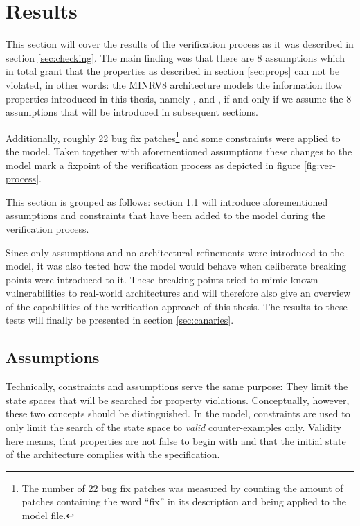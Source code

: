 
\section{Results}
\label{sec:results}

This section will cover the results of the verification process as it was described in section \ref{sec:checking}.
The main finding was that there are 8 assumptions which in total grant that the properties as described in section \ref{sec:props} can not be violated, in other words: the MINRV8 architecture models the information flow properties introduced in this thesis, namely ,  and , if and only if we assume the 8 assumptions that will be introduced in subsequent sections.

Additionally, roughly 22 bug fix patches\footnote{%
    The number of 22 bug fix patches was measured by counting the amount of patches containing the word \enquote{fix} in its description and being applied to the model file.
} and some  constraints were applied to the model.
Taken together with aforementioned assumptions these changes to the model mark a fixpoint of the verification process as depicted in figure \ref{fig:ver-process}.

This section is grouped as follows: section \ref{sec:assumptions} will introduce aforementioned assumptions and  constraints that have been added to the model during the verification process.

Since only assumptions and no architectural refinements were introduced to the model, it was also tested how the model would behave when deliberate breaking points were introduced to it.
These breaking points tried to mimic known vulnerabilities to real-world architectures and will therefore also give an overview of the capabilities of the verification approach of this thesis.
The results to these tests will finally be presented in section \ref{sec:canaries}.

\subsection{Assumptions}
\label{sec:assumptions}

Technically,  constraints and assumptions serve the same purpose: They limit the state spaces that will be searched for property violations.
Conceptually, however, these two concepts should be distinguished.
In the model,  constraints are used to only limit the search of the state space to \textit{valid} counter-examples only.
Validity here means, that properties are not false to begin with and that the initial state of the architecture complies with the specification.

